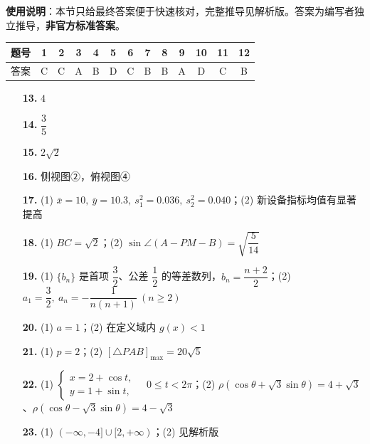 
\begin{gknotice}
\textbf{使用说明}：本节只给最终答案便于快速核对，完整推导见解析版。答案为编写者独立推导，\textbf{非官方标准答案}。
\end{gknotice}

\begin{center}\begin{tabular}{ccccccccccccc}
\toprule
题号 & 1 & 2 & 3 & 4 & 5 & 6 & 7 & 8 & 9 & 10 & 11 & 12 \\
\midrule
答案 & C & C & A & B & D & C & B & B & A & D & C & B \\
\bottomrule
\end{tabular}\end{center}

\begin{itemize}[leftmargin=2.6em]
  \item[\textbf{13.}] $4$
  \item[\textbf{14.}] $\dfrac35$
  \item[\textbf{15.}] $2\sqrt2$
  \item[\textbf{16.}] 侧视图②，俯视图④
\end{itemize}

\begin{itemize}[leftmargin=2.6em]
  \item[\textbf{17.}] (1) $\bar x=10,\ \bar y=10.3,\ s_1^2=0.036,\ s_2^2=0.040$；(2) 新设备指标均值有显著提高
  \item[\textbf{18.}] (1) $BC=\sqrt2$；(2) $\sin\angle(A-PM-B)=\sqrt{\dfrac5{14}}$
  \item[\textbf{19.}] (1) $\{b_n\}$ 是首项 $\dfrac32$、公差 $\dfrac12$ 的等差数列，$b_n=\dfrac{n+2}{2}$；(2) $a_1=\dfrac32,\ a_n=-\dfrac1{n(n+1)}\ (n\geqslant2)$
  \item[\textbf{20.}] (1) $a=1$；(2) 在定义域内 $g(x)<1$
  \item[\textbf{21.}] (1) $p=2$；(2) $[\triangle PAB]_{\max}=20\sqrt5$
\end{itemize}

\begin{itemize}[leftmargin=2.6em]
  \item[\textbf{22.}] (1) $\begin{cases}x=2+\cos t,\\y=1+\sin t,\end{cases}\quad 0\leqslant t<2\pi$；(2) $\rho(\cos\theta+\sqrt3\sin\theta)=4+\sqrt3$、$\rho(\cos\theta-\sqrt3\sin\theta)=4-\sqrt3$
  \item[\textbf{23.}] (1) $(-\infty,-4]\cup[2,+\infty)$；(2) 见解析版
\end{itemize}
